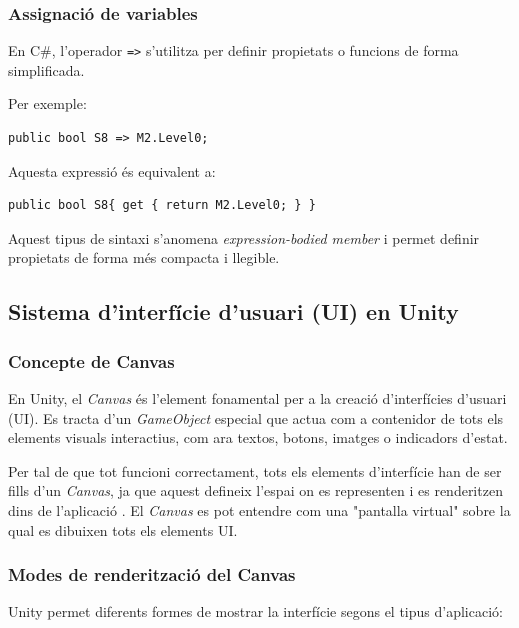 \documentclass[a4paper,11pt,DIV=13,headings=normal,abstract=true,twoside=semi]{article}
\begin{document}
\subsubsection*{Assignació de variables}
En C\#, l'operador \texttt{=>} s'utilitza per definir propietats o funcions de forma simplificada.

Per exemple: \begin{lstlisting}[style=simple]
public bool S8 => M2.Level0;
\end{lstlisting}

Aquesta expressió és equivalent a:

\begin{lstlisting}[style=simple]
public bool S8{ get { return M2.Level0; } }
\end{lstlisting}

Aquest tipus de sintaxi s'anomena \textit{expression-bodied member} \cite{MicrosoftExpressionBodied} i permet definir propietats de forma més compacta i llegible.

\subsection{Sistema d'interfície d'usuari (UI) en Unity}

\subsubsection{Concepte de Canvas}

En Unity, el \textit{Canvas} és l'element fonamental per a la creació d'interfícies d'usuari (UI). Es tracta d'un \textit{GameObject} especial que actua com a contenidor de tots els elements visuals interactius, com ara textos, botons, imatges o indicadors d'estat.

Per tal de que tot funcioni correctament, tots els elements d'interfície han de ser fills d'un \textit{Canvas}, ja que aquest defineix l'espai on es representen i es renderitzen dins de l'aplicació \cite{UnityCanvas}. El \textit{Canvas} es pot entendre com una "pantalla virtual" sobre la qual es dibuixen tots els elements UI.

\subsubsection{Modes de renderització del Canvas}

Unity permet diferents formes de mostrar la interfície segons el tipus d'aplicació:
\end{document}
